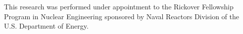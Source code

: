 This research was performed under appointment to the Rickover Fellowship 
Program in Nuclear Engineering sponsored by Naval Reactors Division of the 
U.S. Department of Energy. 